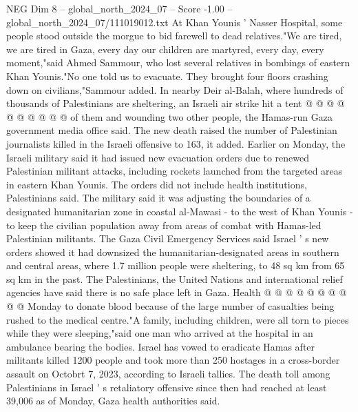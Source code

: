\begin{textsample}{NEG Dim 8 – global\_north\_2024\_07 – Score -1.00 – global\_north\_2024\_07/111019012.txt}
At Khan Younis ' Nasser Hospital, some people stood outside the morgue to bid farewell to dead relatives."We are tired, we are tired in Gaza, every day our children are martyred, every day, every moment,"said Ahmed Sammour, who lost several relatives in bombings of eastern Khan Younis."No one told us to evacuate.
They brought four floors crashing down on civilians,"Sammour added.
In nearby Deir al-Balah, where hundreds of thousands of Palestinians are sheltering, an Israeli air strike hit a tent @ @ @ @ @ @ @ @ @ @ of them and wounding two other people, the Hamas-run Gaza government media office said.
The new death raised the number of Palestinian journalists killed in the Israeli offensive to 163, it added.
Earlier on Monday, the Israeli military said it had issued new evacuation orders due to renewed Palestinian militant attacks, including rockets launched from the targeted areas in eastern Khan Younis.
The orders did not include health institutions, Palestinians said.
The military said it was adjusting the boundaries of a designated humanitarian zone in coastal al-Mawasi - to the west of Khan Younis - to keep the civilian population away from areas of combat with Hamas-led Palestinian militants.
The Gaza Civil Emergency Services said Israel ' s new orders showed it had downsized the humanitarian-designated areas in southern and central areas, where 1.7 million people were sheltering, to 48 sq km from 65 sq km in the past.
The Palestinians, the United Nations and international relief agencies have said there is no safe place left in Gaza.
Health @ @ @ @ @ @ @ @ @ @ Monday to donate blood because of the large number of casualties being rushed to the medical centre."A family, including children, were all torn to pieces while they were sleeping,"said one man who arrived at the hospital in an ambulance bearing the bodies.
Israel has vowed to eradicate Hamas after militants killed 1200 people and took more than 250 hostages in a cross-border assault on Octobrt 7, 2023, according to Israeli tallies.
The death toll among Palestinians in Israel ' s retaliatory offensive since then had reached at least 39,006 as of Monday, Gaza health authorities said.

\end{textsample}
